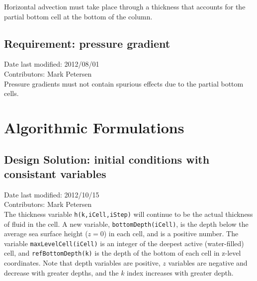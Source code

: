 \documentclass[11pt]{report}
\begin{document}
Horizontal advection must take place through a thickness that accounts for the partial bottom cell at the bottom of the column.

\section{Requirement: pressure gradient}
Date last modified: 2012/08/01 \\
Contributors: Mark Petersen \\

Pressure gradients must not contain spurious effects due to the partial bottom cells.




\chapter{Algorithmic Formulations}

\section{Design Solution: initial conditions with consistant variables}

Date last modified: 2012/10/15 \\
Contributors: Mark Petersen \\

The thickness variable {\tt h(k,iCell,iStep)} will continue to be the actual thickness of fluid in the cell.  
A new variable, {\tt bottomDepth(iCell)}, is the depth below the average sea surface height ($z=0$) in each cell, and is a positive number.    The variable {\tt maxLevelCell(iCell)} is an integer of the deepest active (water-filled) cell, and {\tt refBottomDepth(k)} is the depth of the bottom of each cell in z-level coordinates.  Note that depth variables are positive, $z$ variables are negative and decrease with greater depths, and the $k$ index increases with greater depth.
\end{document}
